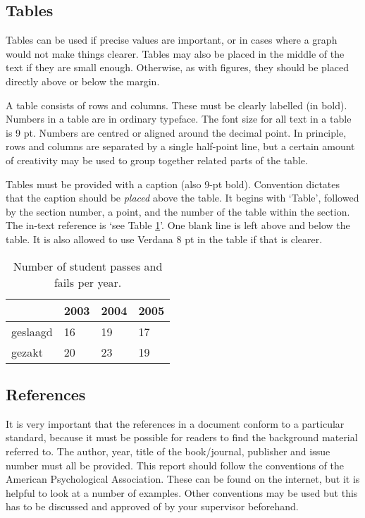 \subsection{Tables}\label{sec_tables}
Tables can be used if precise values are important, or in cases where a graph would not make things clearer. Tables may also be placed in the middle of the text if they are small enough. Otherwise, as with figures, they should be placed directly above or below the margin.

A table consists of rows and columns. These must be clearly labelled (in bold). Numbers in a table are in ordinary typeface. The font size for all text in a table is 9 pt. Numbers are centred or aligned around the decimal point. In principle, rows and columns are separated by a single half-point line, but a certain amount of creativity may be used to group together related parts of the table.

Tables must be provided with a caption (also 9-pt bold). Convention dictates that the caption should be \textit{placed} above the table. It begins with `Table', followed by the section number, a point, and the number of the table within the section. The in-text reference is `see Table \ref{tab:some_table}'. One blank line is left above and below the table. It is also allowed to use Verdana 8 pt in the table if that is clearer.

\begin{table}[!bp]
\caption{Number of student passes and fails per year.}
\label{tab:some_table}
\begin{tabular}{|l|l|l|l|}
\hline
& 2003 & 2004 & 2005 \\ \hline
geslaagd & 16 & 19 & 17 \\ \hline
gezakt & 20 & 23 & 19 \\ \hline
\end{tabular}
\end{table}

\subsection{References}\label{sec:_references}
It is very important that the references in a document conform to a particular standard, because it must be possible for readers to find the background material referred to. The author, year, title of the book/journal, publisher and issue number must all be provided. This report should follow the conventions of the American Psychological Association. These can be found on the internet, but it is helpful to look at a number of examples. Other conventions may be used but this has to be discussed and approved of by your supervisor beforehand.

